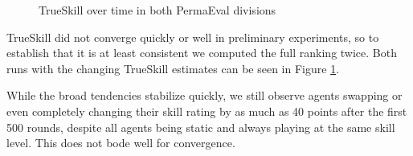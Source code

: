 \begin{figure}[H]
\centering
{}
\caption{TrueSkill over time in both PermaEval divisions}
\label{TrueSkillCompare}
\end{figure}

TrueSkill did not converge quickly or well in preliminary experiments, so to establish that it is at least consistent we computed the full ranking twice. Both runs with the changing TrueSkill estimates can be seen in Figure \ref{TrueSkillCompare}.

While the broad tendencies stabilize quickly, we still observe agents swapping or even completely changing their skill rating by as much as 40 points after the first 500 rounds, despite all agents being static and always playing at the same skill level. This does not bode well for convergence.

